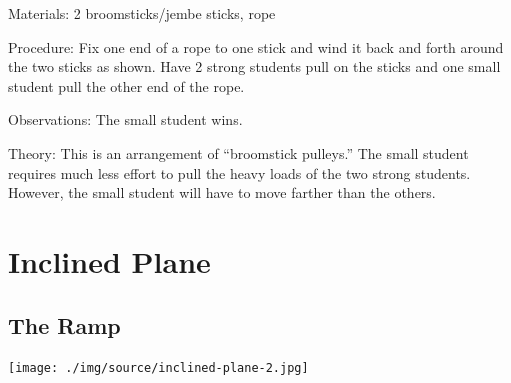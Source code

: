 \begin{multicols}{2}
\begin{description*}
\item[Materials:]{2 broomsticks/jembe sticks, rope}
\item[Procedure:]{Fix one end of a rope to one stick and wind it back and forth around the two sticks as shown. Have 2 strong students pull on the sticks and one small student pull the other end of the rope.}
\item[Observations:]{The small student wins.}
\item[Theory:]{This is an arrangement of ``broomstick pulleys.'' The small student requires much less effort to pull the heavy loads of the two strong students. However, the small student will have to move farther than the others.}
\end{description*}

\vfill
\columnbreak


\section*{Inclined Plane}


\subsection{The Ramp}

\begin{center}
\texttt{[image: ./img/source/inclined-plane-2.jpg]}
\end{center}


\end{multicols}
